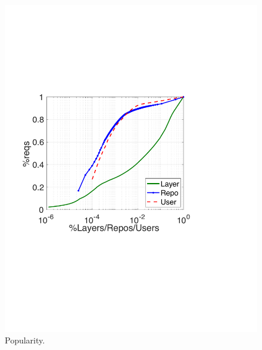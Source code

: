 \begin{figure}[t]
	\centering
		\begin{minipage}{0.22\textwidth}
			\centering
			\includegraphics[width=1\textwidth]{graphs/skewness_cdf.pdf}
			\caption{Popularity.}
			\label{fig:sknewss}
		\end{minipage}
	\begin{minipage}{0.225\textwidth}
		\centering

\end{minipage}
\end{figure}
